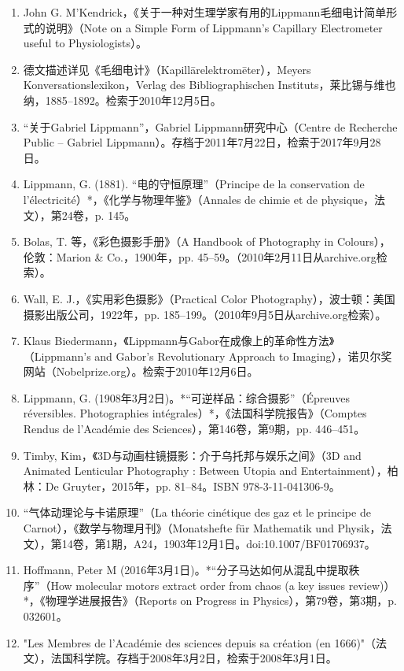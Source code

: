 \begin{enumerate}
\item John G. M'Kendrick，《关于一种对生理学家有用的Lippmann毛细电计简单形式的说明》（Note on a Simple Form of Lippmann's Capillary Electrometer useful to Physiologists）。
\item 德文描述详见《毛细电计》（Kapillārelektromēter），Meyers Konversationslexikon，Verlag des Bibliographischen Instituts，莱比锡与维也纳，1885–1892。检索于2010年12月5日。
\item “关于Gabriel Lippmann”，Gabriel Lippmann研究中心（Centre de Recherche Public – Gabriel Lippmann）。存档于2011年7月22日，检索于2017年9月28日。
\item Lippmann, G. (1881). “电的守恒原理”（Principe de la conservation de l'électricité）*，《化学与物理年鉴》（Annales de chimie et de physique，法文），第24卷，p. 145。
\item Bolas, T. 等，《彩色摄影手册》（A Handbook of Photography in Colours），伦敦：Marion & Co.，1900年，pp. 45–59。（2010年2月11日从archive.org检索）。
\item Wall, E. J.，《实用彩色摄影》（Practical Color Photography），波士顿：美国摄影出版公司，1922年，pp. 185–199。（2010年9月5日从archive.org检索）。
\item Klaus Biedermann，《Lippmann与Gabor在成像上的革命性方法》（Lippmann's and Gabor's Revolutionary Approach to Imaging），诺贝尔奖网站（Nobelprize.org）。检索于2010年12月6日。
\item Lippmann, G. (1908年3月2日)。*“可逆样品：综合摄影”（Épreuves réversibles. Photographies intégrales）*，《法国科学院报告》（Comptes Rendus de l'Académie des Sciences），第146卷，第9期，pp. 446–451。
\item Timby, Kim，《3D与动画柱镜摄影：介于乌托邦与娱乐之间》（3D and Animated Lenticular Photography : Between Utopia and Entertainment），柏林：De Gruyter，2015年，pp. 81–84。ISBN 978-3-11-041306-9。
\item “气体动理论与卡诺原理”（La théorie cinétique des gaz et le principe de Carnot），《数学与物理月刊》（Monatshefte für Mathematik und Physik，法文），第14卷，第1期，A24，1903年12月1日。doi:10.1007/BF01706937。
\item Hoffmann, Peter M (2016年3月1日)。*“分子马达如何从混乱中提取秩序”（How molecular motors extract order from chaos (a key issues review)）*，《物理学进展报告》（Reports on Progress in Physics），第79卷，第3期，p. 032601。
\item "Les Membres de l'Académie des sciences depuis sa création (en 1666)"（法文），法国科学院。存档于2008年3月2日，检索于2008年3月1日。

\end{enumerate}
